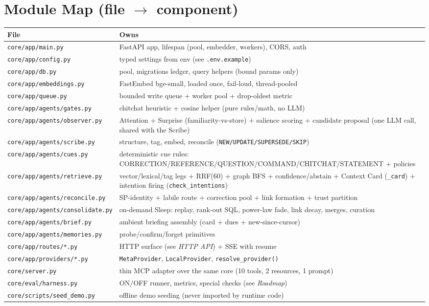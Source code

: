 \section{Module Map (file $\rightarrow$ component)}
\begin{longtable}{@{}p{}p{}@{}}
\toprule
File & Owns \\
\midrule
\texttt{core/app/main.py} & FastAPI app, lifespan (pool, embedder, workers), CORS, auth \\
\texttt{core/app/config.py} & typed settings from env (see \texttt{.env.example}) \\
\texttt{core/app/db.py} & pool, migrations ledger, query helpers (bound params only) \\
\texttt{core/app/embeddings.py} & FastEmbed bge-small, loaded once, fail-loud, thread-pooled \\
\texttt{core/app/queue.py} & bounded write queue + worker pool + drop-oldest metric \\
\texttt{core/app/agents/gates.py} & chitchat heuristic + cosine helper (pure rules/math, no LLM) \\
\texttt{core/app/agents/observer.py} & Attention + Surprise (familiarity-vs-store) + salience scoring + candidate proposal (one LLM call, shared with the Scribe) \\
\texttt{core/app/agents/scribe.py} & structure, tag, embed, reconcile (\texttt{NEW/UPDATE/SUPERSEDE/SKIP}) \\
\texttt{core/app/agents/cues.py} & deterministic cue rules: CORRECTION/REFERENCE/QUESTION/COMMAND/CHITCHAT/STATEMENT + policies \\
\texttt{core/app/agents/retrieve.py} & vector/lexical/tag legs + RRF(60) + graph BFS + confidence/abstain + Context Card (\texttt{\_card}) + intention firing (\texttt{check\_intentions}) \\
\texttt{core/app/agents/reconcile.py} & SP-identity + labile route + correction pool + link formation + trust partition \\
\texttt{core/app/agents/consolidate.py} & on-demand Sleep: replay, rank-out SQL, power-law fade, link decay, merges, curation \\
\texttt{core/app/agents/brief.py} & ambient briefing assembly (card + dues + new-since-cursor) \\
\texttt{core/app/agents/memories.py} & probe/confirm/forget primitives \\
\texttt{core/app/routes/*.py} & HTTP surface (see \emph{HTTP API}) + SSE with resume \\
\texttt{core/app/providers/*.py} & \texttt{MetaProvider}, \texttt{LocalProvider}, \texttt{resolve\_provider()} \\
\texttt{core/server.py} & thin MCP adapter over the same core (10 tools, 2 resources, 1 prompt) \\
\texttt{core/eval/harness.py} & ON/OFF runner, metrics, special checks (see \emph{Roadmap}) \\
\texttt{core/scripts/seed\_demo.py} & offline demo seeding (never imported by runtime code) \\
\bottomrule
\end{longtable}

